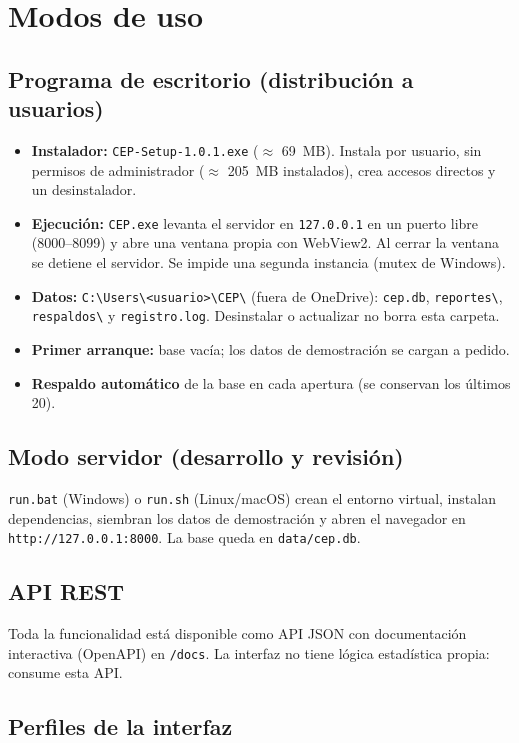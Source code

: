 \documentclass[11pt,a4paper]{article}
\newcommand{\bs}{\textbackslash{}}
\newcommand{\ruta}[1]{\texttt{#1}}
\begin{document}
\section{Modos de uso}

\subsection{Programa de escritorio (distribución a usuarios)}
\begin{itemize}
\item \textbf{Instalador:} \texttt{CEP-Setup-1.0.1.exe} ($\approx$ 69~MB). Instala por usuario,
  sin permisos de administrador ($\approx$ 205~MB instalados), crea accesos directos y un
  desinstalador.
\item \textbf{Ejecución:} \texttt{CEP.exe} levanta el servidor en \texttt{127.0.0.1} en un puerto
  libre (8000--8099) y abre una ventana propia con WebView2. Al cerrar la ventana se detiene el
  servidor. Se impide una segunda instancia (mutex de Windows).
\item \textbf{Datos:} \ruta{C:\bs Users\bs <usuario>\bs CEP\bs} (fuera de OneDrive):
  \texttt{cep.db}, \texttt{reportes\bs}, \texttt{respaldos\bs} y \texttt{registro.log}.
  Desinstalar o actualizar no borra esta carpeta.
\item \textbf{Primer arranque:} base vacía; los datos de demostración se cargan a pedido.
\item \textbf{Respaldo automático} de la base en cada apertura (se conservan los últimos 20).
\end{itemize}

\subsection{Modo servidor (desarrollo y revisión)}
\texttt{run.bat} (Windows) o \texttt{run.sh} (Linux/macOS) crean el entorno virtual, instalan
dependencias, siembran los datos de demostración y abren el navegador en
\texttt{http://127.0.0.1:8000}. La base queda en \texttt{data/cep.db}.

\subsection{API REST}
Toda la funcionalidad está disponible como API JSON con documentación interactiva (OpenAPI) en
\texttt{/docs}. La interfaz no tiene lógica estadística propia: consume esta API.

\subsection{Perfiles de la interfaz}
\end{document}

